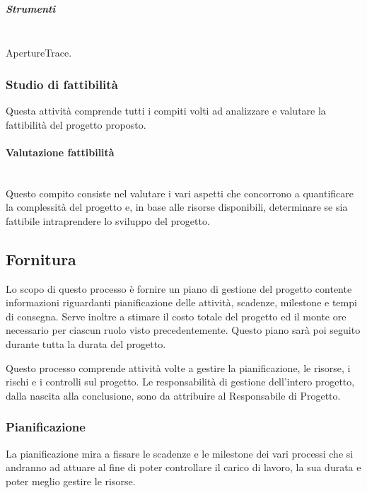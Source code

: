 \subparagraph{Strumenti} \hfill \\
ApertureTrace.

\subsubsection{Studio di fattibilità}
Questa attività comprende tutti i compiti volti ad analizzare e valutare la fattibilità del progetto proposto.

\paragraph{Valutazione fattibilità} \hfill \\
Questo compito consiste nel valutare i vari aspetti che concorrono a quantificare la complessità del progetto e, in base alle risorse disponibili, determinare se sia fattibile intraprendere lo sviluppo del progetto. 


\subsection{Fornitura}
Lo scopo di questo processo è fornire un piano di gestione del progetto contente informazioni riguardanti pianificazione delle attivit\`{a}, scadenze, milestone e tempi di consegna.
Serve inoltre a stimare il costo totale del progetto ed il monte ore necessario per ciascun ruolo visto precedentemente.
Questo piano sarà poi seguito durante tutta la durata del progetto.

Questo processo comprende attivit\`{a} volte a gestire la pianificazione, le risorse, i rischi e i controlli sul progetto.
Le responsabilità di gestione dell’intero progetto, dalla nascita alla conclusione, sono da attribuire al Responsabile di Progetto.

\subsubsection{Pianificazione}
La pianificazione mira a fissare le scadenze e le milestone dei vari processi che si andranno ad attuare al fine di poter controllare il carico di lavoro, la sua durata e poter meglio gestire le risorse.


